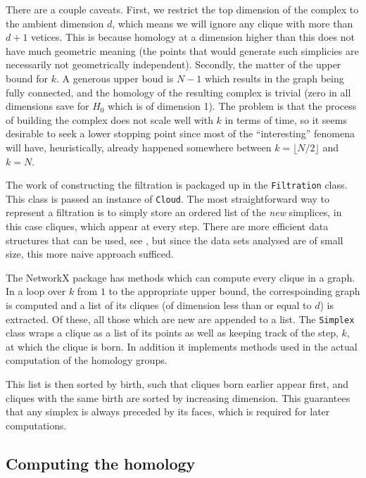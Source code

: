 \documentclass[../main.tex]{subfiles}
\begin{document}
There are a couple caveats. First, we restrict the top dimension of the complex to the
ambient dimension \( d \), which means we will ignore any clique with more than \( d+1 \)
vetices. This is because homology at a dimension higher than this does not have much
geometric meaning (the points that would generate such simplicies are necessarily not
geometrically independent). Secondly, the matter of the upper bound for \( k \). A
generous upper boud is \( N-1 \) which results in the \MKNN graph being fully connected,
and the homology of the resulting complex is trivial (zero in all dimensions save for \(
H_0 \) which is of dimension 1). The problem is that the process of building the complex
does not scale well with \( k \) in terms of time, so it seems desirable to seek a lower
stopping point since most of the ``interesting'' fenomena will have, heuristically, already
happened somewhere between \( k = \lfloor N/2 \rfloor \) and \( k = N \). 

The work of constructing the filtration is packaged up in the \texttt{Filtration} class.
This class is passed an instance of \texttt{Cloud}. The most straightforward way to
represent a filtration is to simply store an ordered list of the \emph{new} simplices, in
this case cliques, which appear at every step. There are more efficient data structures
that can be used, see \cite{efficient, tidyset}, but since the data sets analysed are of small size, this more naive approach sufficed. 

The \textsf{NetworkX} package has methods which can compute every clique in a graph. In a
loop over \( k \) from \( 1 \) to the appropriate upper bound, the correspoinding \MKNN
graph is computed and a list of its cliques (of dimension less than or equal to \( d \))
is extracted. Of these, all those which are new are appended to a list. The
\texttt{Simplex} class wraps a clique as a list of its points as well as keeping track of the
step, \( k \), at which the clique is born. In addition it implements methods used in the
actual computation of the homology groups.

This list is then sorted by birth, such that cliques born earlier appear first, and
cliques with the same birth are sorted by increasing dimension. This guarantees that any
simplex is always preceded by its faces, which is required for later computations. 


\subsection{Computing the homology}\label{sec:justification}
\end{document}
